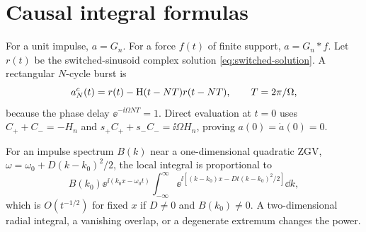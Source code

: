 \chapter{Causal integral formulas}\label{app:causal-integrals}
For a unit impulse, $a=G_n$. For a force $f(t)$ of finite support,
$a=G_n*f$. Let $r(t)$ be the switched-sinusoid complex solution
\cref{eq:switched-solution}. A rectangular $N$-cycle burst is
\begin{equation}a_N^c(t)=r(t)-\mathrm{H}(t-NT)r(t-NT),\qquad T=2\pi/\Omega,
\end{equation}
because the phase delay $\ee^{-\ii\Omega NT}=1$. Direct evaluation at $t=0$
uses $C_++C_-=-H_n$ and
$s_+C_++s_-C_-=\ii\Omega H_n$, proving $a(0)=\dot a(0)=0$.

For an impulse spectrum $B(k)$ near a one-dimensional quadratic ZGV,
$\omega=\omega_0+D(k-k_0)^2/2$, the local integral is proportional to
\begin{equation}
B(k_0)\ee^{\ii(k_0x-\omega_0t)}
\int_{-\infty}^{\infty}\ee^{\ii[(k-k_0)x-Dt(k-k_0)^2/2]}\dd k,
\end{equation}
which is $O(t^{-1/2})$ for fixed $x$ if $D\ne0$ and $B(k_0)\ne0$. A two-dimensional
radial integral, a vanishing overlap, or a degenerate extremum changes the power.
